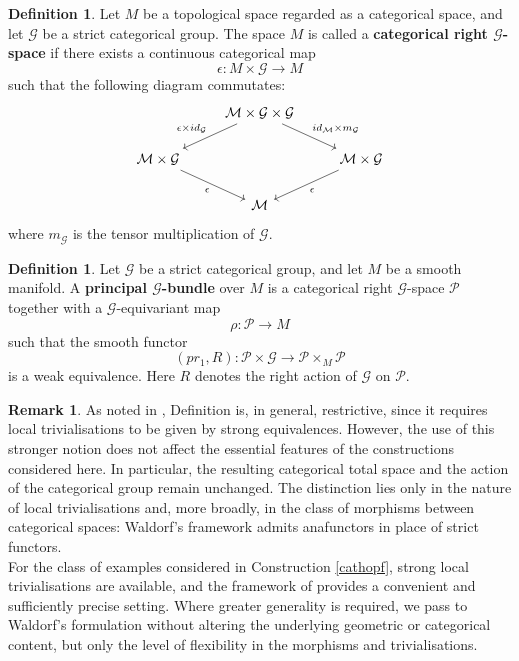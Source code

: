 \documentclass{article}
\theoremstyle{plain}
\theoremstyle{definition}
\newtheorem{defn}[thm]{Definition}
\newtheorem{rem}[thm]{Remark}
\begin{document}
\begin{defn}\cite{MR217087}\cite[Definition 1.7 on page 570]{MR2805195}
Let $M$ be a topological space regarded as a categorical space, and let $\mathcal{G}$ be a strict categorical group. The space $M$ is called a \textbf{categorical right $\mathcal{G}$-space} if there exists a continuous categorical map $$\epsilon:M \times \mathcal{G} \longrightarrow M$$ such that the following diagram commutates:
\[
\begin{tikzcd}
& \mathcal{M} \times \mathcal{G} \times \mathcal{G} \arrow[dl,"\epsilon \times id_{\mathcal{G}}"'] \arrow[dr,"id_{\mathcal{M}} \times m_{\mathcal{G}}"] & \\
\mathcal{M} \times \mathcal{G} \arrow[dr,"\epsilon"'] & & \mathcal{M} \times \mathcal{G} \arrow[dl,"\epsilon"] \\
& \mathcal{M} &
\end{tikzcd}
\]
where $m_{\mathcal{G}}$ is the tensor multiplication of $\mathcal{G}$.
\end{defn}
\begin{defn}\label{prin2bun}\cite{MR2709030}\cite[Definition 6.1.5 on page 389]{MR3089401}
Let $\mathcal{G}$ be a strict categorical group, and let $M$ be a smooth manifold. A \textbf{principal $\mathcal{G}$-bundle} over $M$ is a categorical right $\mathcal{G}$-space $\mathcal{P}$ together with a  $\mathcal{G}$-equivariant map
$$\rho:\mathcal{P} \longrightarrow M$$
such that the smooth functor
\[
(pr_1,R):\mathcal{P} \times \mathcal{G} \longrightarrow \mathcal{P} \times_M \mathcal{P}
\]
is a weak equivalence. Here $R$ denotes the right action of $\mathcal{G}$ on $\mathcal{P}$.
\end{defn}
\begin{rem}
As noted in \cite[Remark 6.2.7 on page 391]{MR3089401}, Definition \cite[Definition 1.8 on page 571]{MR2805195} is, in general, restrictive, since it requires local trivialisations to be given by strong equivalences. However, the use of this stronger notion does not affect the essential features of the constructions considered here. In particular, the resulting categorical total space and the action of the categorical group remain unchanged. The distinction lies only in the nature of local trivialisations and, more broadly, in the class of morphisms between categorical spaces: Waldorf’s framework admits anafunctors in place of strict functors. \\
For the class of examples considered in Construction \ref{cathopf}, strong local trivialisations are available, and the framework of \cite{MR2805195} provides a convenient and sufficiently precise setting. Where greater generality is required, we pass to Waldorf’s formulation without altering the underlying geometric or categorical content, but only the level of flexibility in the morphisms and trivialisations.
\end{rem}
\end{document}
